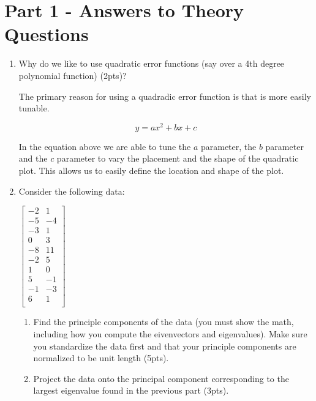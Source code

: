 \documentclass[12pt]{article}
\begin{document}
\maketitle
\section*{Part 1 - Answers to Theory Questions}
\begin{enumerate}
\item Why do we like to use quadratic error functions (say over a 4th degree polynomial function) (2pts)?

\noindent
The primary reason for using a quadradic error function is that is more easily tunable. 

\begin{equation}
y = ax^2 + bx + c
\end{equation}

In the equation above we are able to tune the $a$ parameter, the $b$ parameter and the $c$ parameter to vary the placement and the shape of the quadratic plot. This allows us to easily define the location and shape of the plot.


\newpage
\item Consider the following data:\\
\begin{center}
$
 \begin{bmatrix}
	-2 & 1\\
	-5 & -4\\	
	-3 & 1\\
	0 & 3\\
	-8 & 11\\
	-2 & 5\\
	1 & 0\\
	5 & -1\\
	-1 & -3\\
	6 & 1\\
\end{bmatrix}
$
\end{center}
	\begin{enumerate}
	\item Find the principle components of the data (you must show the math, including how you compute the eivenvectors and eigenvalues).  Make sure you standardize the data first and that your principle components are normalized to be unit length (5pts).
\newpage
	\item Project the data onto the principal component corresponding to the largest eigenvalue found in the previous part (3pts).
	\end{enumerate}


\end{enumerate}
\end{document}
